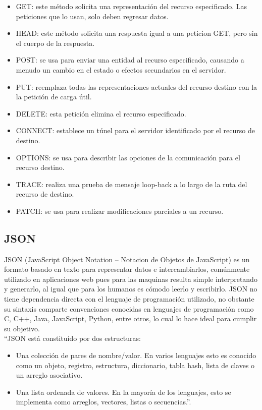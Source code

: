 \begin{itemize}
	\item GET: este método solicita una representación del recurso especificado. Las peticiones que lo usan, solo deben regresar datos.
	\item HEAD: este método solicita una respuesta igual a una peticion GET, pero sin el cuerpo de la respuesta.
	\item POST: se usa para enviar una entidad al recurso especificado, causando a menudo un cambio en el estado o efectos secundarios en el servidor.
	\item PUT: reemplaza todas las representaciones actuales del recurso destino con la la petición de carga útil.
	\item DELETE: esta petición elimina el recurso especificado.
	\item CONNECT: establece un túnel para el servidor identificado por el recurso de destino.
	\item OPTIONS: se usa para describir las opciones de la comunicación para el recurso destino.
	\item TRACE: realiza una prueba de mensaje loop-back a lo largo de la ruta del recurso de destino. 
	\item PATCH: se usa para realizar modificaciones parciales a un recurso.
\end{itemize}

\subsection{JSON}

JSON (JavaScript Object Notation – Notacion de Objetos de JavaScript) es un formato basado en texto para representar datos e intercambiarlos, comúnmente utilizado en aplicaciones web pues para las maquinas resulta simple interpretando y generarlo, al igual que para los humanos es cómodo leerlo y escribirlo. JSON no tiene dependencia directa con el lenguaje de programación utilizado, no obstante su sintaxis comparte convenciones conocidas en  lenguajes de programación como C, C++, Java, JavaScript, Python, entre otros, lo cual lo hace ideal para cumplir su objetivo. \\

``JSON está constituído por dos estructuras:

\begin{itemize}
	\item Una colección de pares de nombre/valor. En varios lenguajes esto es conocido como un objeto, registro, estructura, diccionario, tabla hash, lista de claves o un arreglo asociativo.
	\item Una lista ordenada de valores. En la mayoría de los lenguajes, esto se implementa como arreglos, vectores, listas o secuencias.''\cite{JSON}.
\end{itemize}


